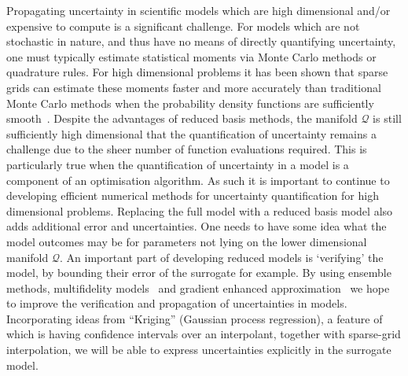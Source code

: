 Propagating uncertainty in scientific models which are high
dimensional and/or expensive to compute is a significant challenge.
For models which are not stochastic in nature, and thus have no means
of directly quantifying uncertainty, one must typically estimate
statistical moments via Monte Carlo methods or quadrature rules. For
high dimensional problems it has been shown that sparse grids can
estimate these moments faster and more accurately than traditional
Monte Carlo methods when the probability density functions are
sufficiently
smooth~\parencite{JakemanRoberts2013,FranzelinDiehlPfluger2014}.
Despite the advantages of reduced basis methods, the manifold
$\mathcal{Q}$ is still sufficiently high dimensional that the
quantification of uncertainty remains a challenge due to the sheer
number of function evaluations required. This is particularly true
when the quantification of uncertainty in a model is a component of an
optimisation algorithm. As such it is important to continue to
developing efficient numerical methods for uncertainty quantification
for high dimensional problems. Replacing the full model with a reduced
basis model also adds additional error and uncertainties. One needs to
have some idea what the model outcomes may be for parameters not lying
on the lower dimensional manifold $\mathcal{Q}$. An important part of
developing reduced models is `verifying' the model, by bounding their
error of the surrogate for example. By using ensemble methods,
multifidelity models~\parencite{NgWillcox2014} and gradient enhanced
approximation~\parencite{deBaarHarding2015,Jakeman2015} we hope to
improve the verification and propagation of uncertainties in models.
Incorporating ideas from ``Kriging'' (Gaussian process regression), a
feature of which is having confidence intervals over an interpolant,
together with sparse-grid interpolation, we will be able to express
uncertainties explicitly in the surrogate model.

